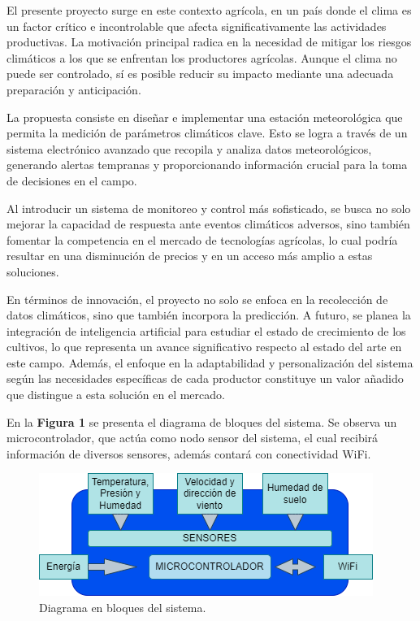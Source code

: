 \documentclass[
11pt, %
codirector, %
]{charter}
\begin{document}
El presente proyecto surge en este contexto agrícola, en un país donde el clima es un factor crítico e incontrolable que afecta significativamente las actividades productivas. La motivación principal radica en la necesidad de mitigar los riesgos climáticos a los que se enfrentan los productores agrícolas. Aunque el clima no puede ser controlado, sí es posible reducir su impacto mediante una adecuada preparación y anticipación.

La propuesta consiste en diseñar e implementar una estación meteorológica que permita la medición de parámetros climáticos clave. Esto se logra a través de un sistema electrónico avanzado que recopila y analiza datos meteorológicos, generando alertas tempranas y proporcionando información crucial para la toma de decisiones en el campo.

Al introducir un sistema de monitoreo y control más sofisticado, se busca no solo mejorar la capacidad de respuesta ante eventos climáticos adversos, sino también fomentar la competencia en el mercado de tecnologías agrícolas, lo cual podría resultar en una disminución de precios y en un acceso más amplio a estas soluciones.

En términos de innovación, el proyecto no solo se enfoca en la recolección de datos climáticos, sino que también incorpora la predicción. A futuro, se planea la integración de inteligencia artificial para estudiar el estado de crecimiento de los cultivos, lo que representa un avance significativo respecto al estado del arte en este campo. Además, el enfoque en la adaptabilidad y personalización del sistema según las necesidades específicas de cada productor constituye un valor añadido que distingue a esta solución en el mercado.

En la \textbf{Figura 1} se presenta el diagrama de bloques del sistema. Se observa un microcontrolador, que actúa como nodo sensor del sistema, el cual recibirá información de diversos sensores, además contará con conectividad WiFi.

\begin{figure}[htpb]
\centering 
\includegraphics[width=.85\textwidth]{./Figuras/projectDiagram1.png}
\caption{Diagrama en bloques del sistema.}
\label{fig:diagBloques}
\end{figure}
\end{document}
